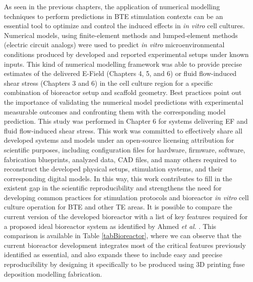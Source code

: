 As seen in the previous chapters, the application of numerical modelling techniques to perform predictions in \acs{BTE} stimulation contexts can be an essential tool to optimize and control the induced effects in \textit{in vitro} cell cultures. Numerical models, using finite-element methods and lumped-element methods (electric circuit analogs) were used to predict \textit{in vitro} microenvironmental conditions produced by developed and reported experimental setups under known inputs. This kind of numerical modelling framework was able to provide precise estimates of the delivered E-Field (Chapters 4, 5, and 6) or fluid flow-induced shear stress (Chapters 3 and 6) in the cell culture region for a specific combination of bioreactor setup and scaffold geometry. Best practices \cite{Klein2022-yj} point out the importance of validating the numerical model predictions with experimental measurable outcomes and confronting them with the corresponding model prediction. This study was performed in Chapter 6 for systems delivering \acs{EF} and fluid flow-induced shear stress. This work was committed to effectively share all developed systems and models under an open-source licensing attribution for scientific purposes, including configuration files for hardware, firmware, software, fabrication blueprints, analyzed data, \acs{CAD} files, and many others required to reconstruct the developed physical setups, stimulation systems, and their corresponding digital models. In this way, this work contributes to fill in the existent gap in the scientific reproducibility and strengthens the need for developing common practices for stimulation protocols and bioreactor \textit{in vitro} cell culture operation for \acs{BTE} and other \acs{TE} areas. It is possible to compare the current version of the developed bioreactor with a list of key features required for a proposed ideal bioreactor system as identified by Ahmed \textit{et al.} \cite{Ahmed2019-uk}. This comparison is available in Table \ref{tabBioreactor}, where we can observe that the current bioreactor development integrates most of the critical features previously identified as essential, and also expands these to include easy and precise reproducibility by designing it specifically to be produced using \acs{3D} printing fuse deposition modelling fabrication. 


